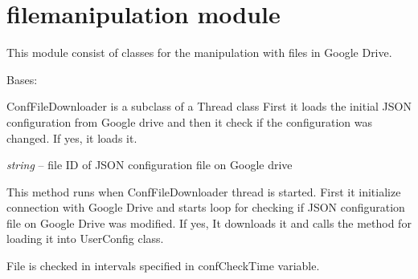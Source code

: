 \documentclass[letterpaper,10pt,english,openany]{sphinxmanual}
\begin{document}
\chapter{filemanipulation module}
\label{index:filemanipulation-module}
This module consist of classes for the manipulation with files in Google Drive.
\label{index:module-rpicameramon.filemanipulation}

\begin{fulllineitems}
\label{index:rpicameramon.filemanipulation.ConfFileDownloader}
Bases: 

ConfFileDownloader is a subclass of a Thread class
First it loads the initial JSON configuration from Google drive
and then it check if the configuration was changed. If yes, it loads it.

\begin{fulllineitems}
\label{index:rpicameramon.filemanipulation.ConfFileDownloader.filename}
\emph{string} -- file ID of JSON configuration file on Google drive

\end{fulllineitems}


\begin{fulllineitems}
\label{index:rpicameramon.filemanipulation.ConfFileDownloader.run}
This method runs when ConfFileDownloader thread is started.
First it initialize connection with Google Drive and starts loop
for checking if JSON configuration file on Google Drive was modified.
If yes, It downloads it and calls the method for loading it into UserConfig class.

File is checked in intervals specified in confCheckTime variable.

\end{fulllineitems}



\end{fulllineitems}
\end{document}
